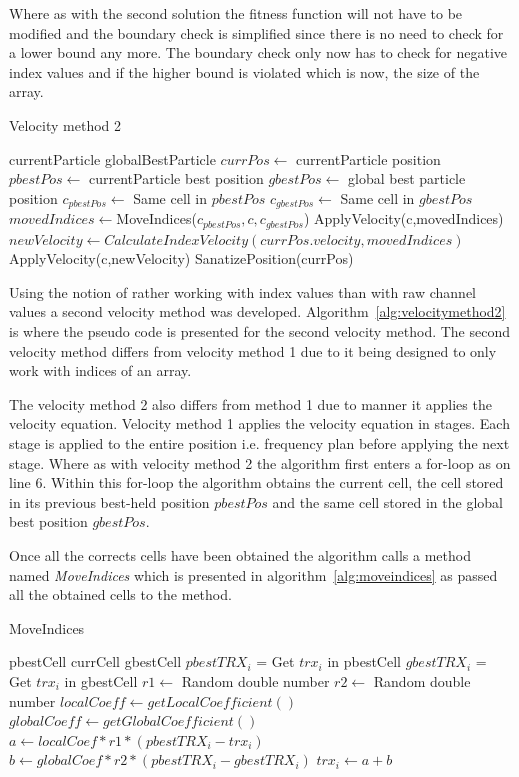 Where as with the second solution the fitness function will not have to be modified and the boundary check is simplified since there is no need to check for a lower bound any more. The boundary check only now has to check for negative index values and if the higher bound is violated which is now, the size of the array.
\begin{algorithm}
\caption{Velocity method 2}
\label{alg:velocitymethod2}
\begin{algorithmic}[1]
	\REQUIRE currentParticle
	\REQUIRE globalBestParticle
	\STATE $currPos \leftarrow$ currentParticle position
	\STATE $pbestPos \leftarrow$ currentParticle best position
	\STATE $gbestPos \leftarrow$ global best particle position
		\STATE $c_{pbestPos} \leftarrow $ Same cell in $pbestPos$
		\STATE $c_{gbestPos} \leftarrow $ Same cell in $gbestPos$
		\STATE $movedIndices \leftarrow $MoveIndices($c_{pbestPos},c,c_{gbestPos}$)
			\STATE ApplyVelocity(c,movedIndices)
		\ELSE
			\STATE $newVelocity \leftarrow CalculateIndexVelocity(currPos.velocity,movedIndices)$
			\STATE ApplyVelocity(c,newVelocity)
		\ENDIF
	\ENDFOR
	\STATE SanatizePosition(currPos)
\end{algorithmic}
\end{algorithm}
Using the notion of rather working with index values than with raw channel values a second velocity method was developed. Algorithm~\ref{alg:velocitymethod2} is where the pseudo code is presented for the second velocity method. The second velocity method differs from velocity method 1 due to it being designed to only work with indices of an array.

The velocity method 2 also differs from method 1 due to manner it applies the velocity equation. Velocity method 1 applies the velocity equation in stages. Each stage is applied to the entire position i.e. frequency plan before applying the next stage. Where as with velocity method 2 the algorithm first enters a for-loop as on line 6. Within this for-loop the algorithm obtains the current cell, the cell stored in its previous best-held position $pbestPos$ and the same cell stored in the global best position $gbestPos$.

Once all the corrects cells have been obtained the algorithm calls a method named \emph{MoveIndices} which is presented in algorithm~\ref{alg:moveindices} as passed all the obtained cells to the method.
\begin{algorithm}
\caption {MoveIndices}
\label{alg:moveindices}
\begin{algorithmic}[1]
	\REQUIRE pbestCell
	\REQUIRE currCell
	\REQUIRE gbestCell
		\STATE $pbestTRX_i$ = Get $trx_i$ in pbestCell
		\STATE $gbestTRX_i$ = Get $trx_i$ in gbestCell
		\STATE $r1 \leftarrow$ Random double number
		\STATE $r2 \leftarrow$ Random double number
		\STATE $localCoeff \leftarrow getLocalCoefficient()$
		\STATE $globalCoeff \leftarrow getGlobalCoefficient()$
		\STATE $a \leftarrow localCoef * r1 * (pbestTRX_i - trx_i)$
		\STATE $b \leftarrow globalCoef * r2 * (pbestTRX_i - gbestTRX_i)$
		\STATE $trx_i \leftarrow a + b$
	\ENDFOR
\end{algorithmic}
\end{algorithm}

